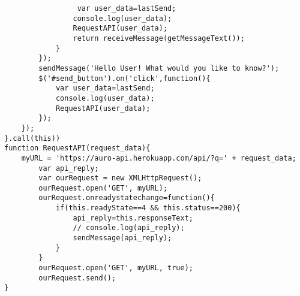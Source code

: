 \begin{verbatim}
                 var user_data=lastSend;
                console.log(user_data);
                RequestAPI(user_data);
                return receiveMessage(getMessageText());
            }
        });
        sendMessage('Hello User! What would you like to know?');
        $('#send_button').on('click',function(){
            var user_data=lastSend;
            console.log(user_data);
            RequestAPI(user_data);
        });
    });
}.call(this))
function RequestAPI(request_data){
    myURL = 'https://auro-api.herokuapp.com/api/?q=' + request_data;
        var api_reply;
        var ourRequest = new XMLHttpRequest();
        ourRequest.open('GET', myURL);
        ourRequest.onreadystatechange=function(){
            if(this.readyState==4 && this.status==200){
                api_reply=this.responseText;
                // console.log(api_reply);
                sendMessage(api_reply);
            }
        }
        ourRequest.open('GET', myURL, true);
        ourRequest.send();
}
\end{verbatim}